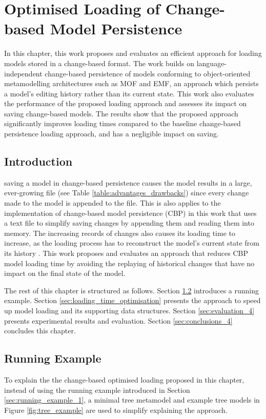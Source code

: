 \chapter{Optimised Loading of Change-based Model Persistence}
\label{ch:optimised_loading}

In this chapter, this work proposes and evaluates an efficient approach for loading models stored in a change-based format. The work builds on language-independent change-based persistence of models conforming to object-oriented metamodelling architectures such as MOF and EMF, an approach which persists a model's editing history rather than its current state. This work also evaluates the performance of the proposed loading approach and assesses its impact on saving change-based models. The results show that the proposed approach significantly improves loading times compared to the baseline change-based persistence loading approach, and has a negligible impact on saving.

\section{Introduction}
\label{sec:introduction_4}
saving a model in change-based persistence causes the model results in a large, ever-growing file (see Table \ref{table:advantages_drawbacks}) since every change made to the model is appended to the file. This is also applies to the implementation of change-based model persistence (CBP) in this work that
uses a text file to simplify saving changes by appending them and reading them into memory. The increasing records of changes also causes its loading time to increase, as the loading process has to reconstruct the model's current state from its history \cite{DBLP:conf/models/YohannisKP17}. This work proposes and evaluates an approach that reduces CBP model loading time by avoiding the replaying of historical changes that have no impact on the final state of the model.

The rest of this chapter is structured as follows. Section \ref{sec:case_study} introduces a running example.
Section \ref{sec:loading_time_optimisation} presents the approach to speed up model loading and its supporting data structures. Section \ref{sec:evaluation_4} presents experimental results and evaluation.  Section \ref{sec:conclusions_4} concludes this chapter.

\section{Running Example}
\label{sec:case_study}
To explain the the change-based optimised loading proposed in this chapter, instead of using the running example introduced in Section \ref{sec:running_example_1}, a minimal tree metamodel and example tree models in Figure \ref{fig:tree_example} are used to simplify explaining the approach.
 

